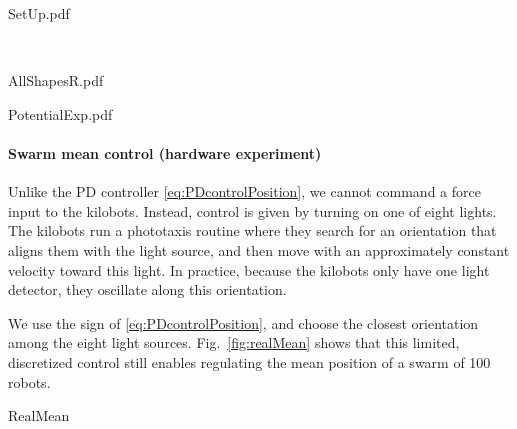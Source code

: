 \begin{figure*}
\begin{center}
	\begin{overpic}[width=0.6\columnwidth]{SetUp.pdf}%
	\end{overpic}\\
	\begin{overpic}[width=0.35\columnwidth]{AllShapesR.pdf}%
	\end{overpic}
	\begin{overpic}[width=0.35\columnwidth]{PotentialExp.pdf}%
	\end{overpic}
\end{center}

\caption{\label{fig:setup}
(Top) Hardware platform. (Lower left) Four shapes used for hardware experiments. (Lower right) Visualization of potential field. }
\end{figure*}

\paragraph{Swarm mean control (hardware experiment)}

Unlike the PD controller \eqref{eq:PDcontrolPosition}, we cannot command a force input to the kilobots.  Instead, control is given by turning on one of eight lights.  The kilobots run a phototaxis routine where they search for an orientation that aligns them with the light source, and then move with an approximately constant velocity toward this light.  In practice, because the kilobots only have one light detector, they oscillate along this orientation.  

We use the sign of \eqref{eq:PDcontrolPosition}, and choose the closest orientation among the eight light sources.
Fig.~\ref{fig:realMean} shows that this limited, discretized control still enables regulating the mean position of a swarm of 100 robots.


\begin{figure*}
\begin{center}
	\begin{overpic}[width=\columnwidth]{RealMean}\end{overpic}
\end{center}
\vspace{-1em}
\caption{\label{fig:realMean}
Regulating average $x$ position of 100 kilobots using control law \eqref{eq:PDcontrolPosition}.
}
\end{figure*}

